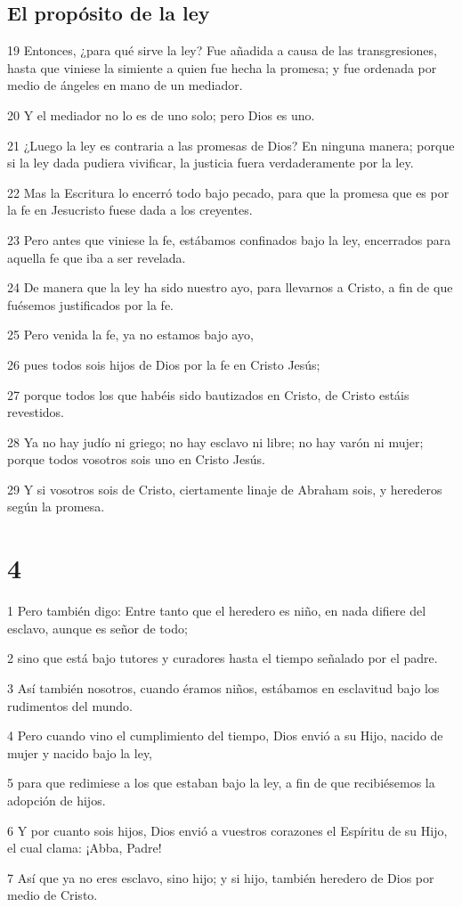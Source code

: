 \section*{El propósito de la ley}

\par 19 Entonces, ¿para qué sirve la ley? Fue añadida a causa de las transgresiones, hasta que viniese la simiente a quien fue hecha la promesa; y fue ordenada por medio de ángeles en mano de un mediador.
\par 20 Y el mediador no lo es de uno solo; pero Dios es uno.
\par 21 ¿Luego la ley es contraria a las promesas de Dios? En ninguna manera; porque si la ley dada pudiera vivificar, la justicia fuera verdaderamente por la ley.
\par 22 Mas la Escritura lo encerró todo bajo pecado, para que la promesa que es por la fe en Jesucristo fuese dada a los creyentes.
\par 23 Pero antes que viniese la fe, estábamos confinados bajo la ley, encerrados para aquella fe que iba a ser revelada.
\par 24 De manera que la ley ha sido nuestro ayo, para llevarnos a Cristo, a fin de que fuésemos justificados por la fe.
\par 25 Pero venida la fe, ya no estamos bajo ayo,
\par 26 pues todos sois hijos de Dios por la fe en Cristo Jesús;
\par 27 porque todos los que habéis sido bautizados en Cristo, de Cristo estáis revestidos.
\par 28 Ya no hay judío ni griego; no hay esclavo ni libre; no hay varón ni mujer; porque todos vosotros sois uno en Cristo Jesús.
\par 29 Y si vosotros sois de Cristo, ciertamente linaje de Abraham sois, y herederos según la promesa.

\chapter{4}

\par 1 Pero también digo: Entre tanto que el heredero es niño, en nada difiere del esclavo, aunque es señor de todo;
\par 2 sino que está bajo tutores y curadores hasta el tiempo señalado por el padre.
\par 3 Así también nosotros, cuando éramos niños, estábamos en esclavitud bajo los rudimentos del mundo.
\par 4 Pero cuando vino el cumplimiento del tiempo, Dios envió a su Hijo, nacido de mujer y nacido bajo la ley,
\par 5 para que redimiese a los que estaban bajo la ley, a fin de que recibiésemos la adopción de hijos.
\par 6 Y por cuanto sois hijos, Dios envió a vuestros corazones el Espíritu de su Hijo, el cual clama: ¡Abba, Padre!
\par 7 Así que ya no eres esclavo, sino hijo; y si hijo, también heredero de Dios por medio de Cristo.

